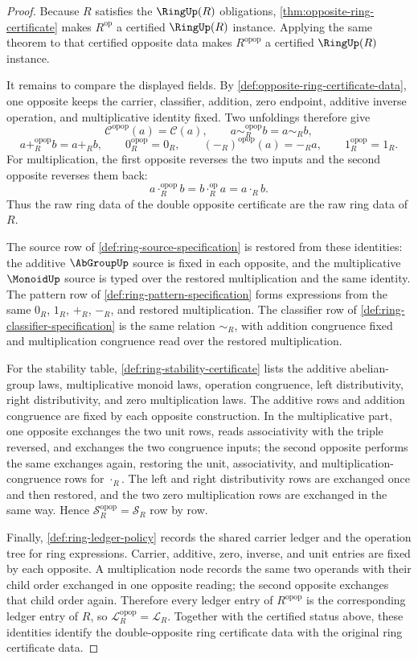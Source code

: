\begin{proof}
Because $R$ satisfies the $\RingUp(R)$ obligations,
\autoref{thm:opposite-ring-certificate} makes $R^{\mathrm{op}}$ a certified
$\RingUp(R)$ instance. Applying the same theorem to that certified opposite
data makes $R^{\mathrm{opop}}$ a certified $\RingUp(R)$ instance.

It remains to compare the displayed fields. By
\autoref{def:opposite-ring-certificate-data}, one opposite keeps the carrier,
classifier, addition, zero endpoint, additive inverse operation, and
multiplicative identity fixed. Two unfoldings therefore give
$$
\mathcal C^{\mathrm{opop}}(a)=\mathcal C(a),
\qquad
 a\sim_R^{\mathrm{opop}} b=a\sim_R b,
$$
$$
a+_R^{\mathrm{opop}} b=a+_R b,
\qquad
0_R^{\mathrm{opop}}=0_R,
\qquad
(-_R)^{\mathrm{opop}}(a)=-_R a,
\qquad
1_R^{\mathrm{opop}}=1_R.
$$
For multiplication, the first opposite reverses the two inputs and the second
opposite reverses them back:
$$
a\cdot_R^{\mathrm{opop}} b
=b\cdot_R^{\mathrm{op}} a
=a\cdot_R b.
$$
Thus the raw ring data of the double opposite certificate are the raw ring data
of $R$.

The source row of \autoref{def:ring-source-specification} is restored from
these identities: the additive $\AbGroupUp$ source is fixed in each opposite,
and the multiplicative $\MonoidUp$ source is typed over the restored
multiplication and the same identity. The pattern row of
\autoref{def:ring-pattern-specification} forms expressions from the same
$0_R$, $1_R$, $+_R$, $-_R$, and restored multiplication. The classifier row of
\autoref{def:ring-classifier-specification} is the same relation $\sim_R$, with
addition congruence fixed and multiplication congruence read over the restored
multiplication.

For the stability table, \autoref{def:ring-stability-certificate} lists the
additive abelian-group laws, multiplicative monoid laws, operation congruence,
left distributivity, right distributivity, and zero multiplication laws. The
additive rows and addition congruence are fixed by each opposite construction.
In the multiplicative part, one opposite exchanges the two unit rows, reads
associativity with the triple reversed, and exchanges the two congruence inputs;
the second opposite performs the same exchanges again, restoring the unit,
associativity, and multiplication-congruence rows for $\cdot_R$. The left and
right distributivity rows are exchanged once and then restored, and the two
zero multiplication rows are exchanged in the same way. Hence
$\mathcal S_R^{\mathrm{opop}}=\mathcal S_R$ row by row.

Finally, \autoref{def:ring-ledger-policy} records the shared carrier ledger and
the operation tree for ring expressions. Carrier, additive, zero, inverse, and
unit entries are fixed by each opposite. A multiplication node records the same
two operands with their child order exchanged in one opposite reading; the
second opposite exchanges that child order again. Therefore every ledger entry
of $R^{\mathrm{opop}}$ is the corresponding ledger entry of $R$, so
$\mathcal L_R^{\mathrm{opop}}=\mathcal L_R$. Together with the certified status
above, these identities identify the double-opposite ring certificate data with
the original ring certificate data.
\end{proof}
